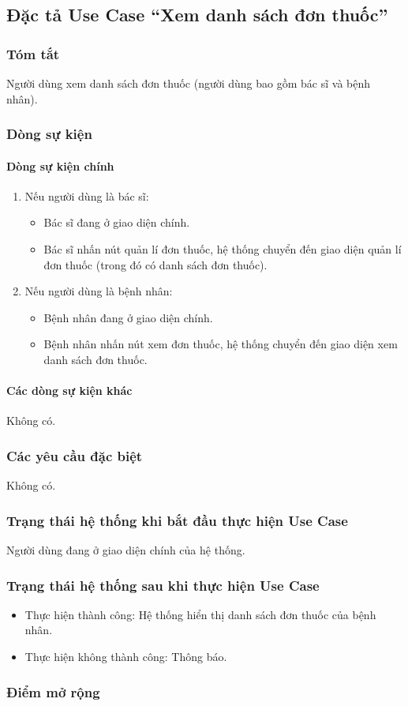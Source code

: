 \subsection{Đặc tả Use Case ``Xem danh sách đơn thuốc''}

\subsubsection{Tóm tắt}
Người dùng xem danh sách đơn thuốc (người dùng bao gồm bác sĩ và bệnh nhân).

\subsubsection{Dòng sự kiện}
\paragraph{\textbf{Dòng sự kiện chính}}
\begin{enumerate}
  \item Nếu người dùng là bác sĩ:
    \begin{itemize}
      \item Bác sĩ đang ở giao diện chính.
      \item Bác sĩ nhấn nút quản lí đơn thuốc, hệ thống chuyển đến giao diện quản lí đơn thuốc (trong đó có danh sách đơn thuốc).
    \end{itemize}
  \item Nếu người dùng là bệnh nhân:
    \begin{itemize}
      \item Bệnh nhân đang ở giao diện chính.
      \item Bệnh nhân nhấn nút xem đơn thuốc, hệ thống chuyển đến giao diện xem danh sách đơn thuốc.
    \end{itemize}
\end{enumerate}

\paragraph{\textbf{Các dòng sự kiện khác}}
Không có.

\subsubsection{Các yêu cầu đặc biệt}
Không có.

\subsubsection{Trạng thái hệ thống khi bắt đầu thực hiện Use Case}
Người dùng đang ở giao diện chính của hệ thống.

\subsubsection{Trạng thái hệ thống sau khi thực hiện Use Case}
\begin{itemize}
  \item Thực hiện thành công: Hệ thống hiển thị danh sách đơn thuốc của bệnh nhân.
  \item Thực hiện không thành công: Thông báo.
\end{itemize}

\subsubsection{Điểm mở rộng}